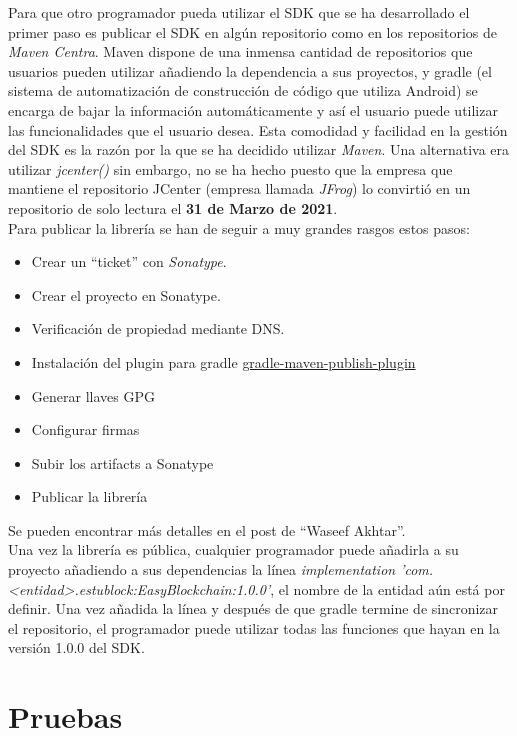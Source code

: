 Para que otro programador pueda utilizar el SDK que se ha desarrollado el primer paso es publicar el SDK en algún repositorio como en los repositorios de \emph{Maven Centra}\cite{maven}. Maven dispone de una inmensa cantidad de repositorios que usuarios pueden utilizar añadiendo la dependencia a sus proyectos, y gradle (el sistema de automatización de construcción de código que utiliza Android) se encarga de bajar la información automáticamente y así el usuario puede utilizar las funcionalidades que el usuario desea. Esta comodidad y facilidad en la gestión del SDK es la razón por la que se ha decidido utilizar \emph{Maven}. Una alternativa era utilizar \emph{jcenter()} sin embargo, no se ha hecho puesto que la empresa que mantiene el repositorio JCenter (empresa llamada \emph{JFrog}\cite{jfrog}) lo convirtió en un repositorio de solo lectura el \textbf{31 de Marzo de 2021}. \\

Para publicar la librería se han de seguir a muy grandes rasgos estos pasos:
\begin{itemize}
\item Crear un ``ticket'' con \emph{Sonatype}\cite{sonatype}.
\item Crear el proyecto en Sonatype.
\item Verificación de propiedad mediante DNS.
\item Instalación del plugin para gradle \href{https://github.com/vanniktech/gradle-maven-publish-plugin}{gradle-maven-publish-plugin}
\item Generar llaves GPG
\item Configurar firmas
\item Subir los artifacts a Sonatype
\item Publicar la librería
\end{itemize}

Se pueden encontrar más detalles en el post de ``Waseef Akhtar''\cite{waseef}. \\

Una vez la librería es pública, cualquier programador puede añadirla a su proyecto añadiendo a sus dependencias la línea \textit{implementation 'com.<entidad>.estublock:EasyBlockchain:1.0.0'}, el nombre de la entidad aún está por definir. Una vez añadida la línea y después de que gradle termine de sincronizar el repositorio, el programador puede utilizar todas las funciones que hayan en la versión 1.0.0 del SDK.


\section{Pruebas}

